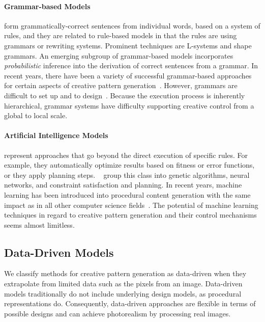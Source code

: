 \paragraph*{Grammar-based Models}
form grammatically-correct sentences from individual words, based on a system of rules, and they are related to rule-based models in that the rules are using grammars or rewriting systems. 
Prominent techniques are L-systems and shape grammars. An emerging subgroup of grammar-based models incorporates \textit{probabilistic} inference into the derivation of correct sentences from a grammar. In recent years, there have been a variety of successful grammar-based approaches for certain aspects of creative pattern generation~\cite{benes_2011_gpm,talton_2011_mpm,ritchie_2015_cpm}. However, grammars are difficult to set up and to design~\cite{stava_2010_ipm}. Because the execution process is inherently hierarchical, grammar systems have difficulty supporting creative control from a global to local scale.


\paragraph*{Artificial Intelligence Models} represent approaches that go beyond the direct execution of specific rules. For example, they automatically optimize results based on fitness or error functions, or they apply planning steps. \citeauthor*{hendrikx_2013_pcg}~\cite{hendrikx_2013_pcg} group this class into genetic algorithms, neural networks, and constraint satisfaction and planning. In recent years, machine learning has been introduced into procedural content generation with the same impact as in all other computer science fields~\cite{summerville_2017_pcg}. The potential of machine learning techniques in regard to creative pattern generation and their control mechanisms seems almost limitless.



\subsection[Data-Driven]{Data-Driven Models}
\label{subsec:design_models_datadriven}

We classify methods for creative pattern generation as data-driven when they extrapolate from limited data such as the pixels from an image.
Data-driven models traditionally do not include underlying design models, as procedural representations do. Consequently, data-driven approaches are flexible in terms of possible designs and can achieve photorealism by processing real images.

